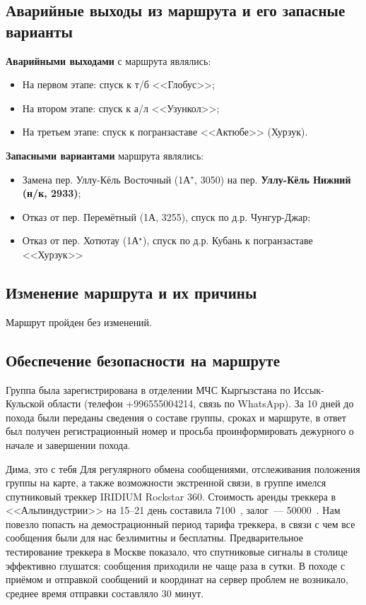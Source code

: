 \subsection{Аварийные выходы из маршрута и его запасные варианты}
\textbf{Аварийными выходами} с маршрута являлись:
\begin{itemize}
	\item На первом этапе: спуск к т/б <<Глобус>>;
	\item На втором этапе: спуск к а/л <<Узункол>>;
	\item На третьем этапе: спуск к погранзаставе <<Актюбе>> (Хурзук).
\end{itemize}
\textbf{Запасными вариантами} маршрута являлись:
\begin{itemize}
	\item Замена пер. Уллу-Кёль Восточный (1А$^\star$, 3050) на пер. \textbf{Уллу-Кёль Нижний (н/к, 2933)};
	\item Отказ от пер. Перемётный (1А, 3255), спуск по д.р. Чунгур-Джар;
	\item Отказ от пер. Хотютау (1А$^\star$), спуск по д.р. Кубань к погранзаставе <<Хурзук>>
\end{itemize}
\subsection{Изменение маршрута и их причины}
Маршрут пройден без изменений.
\subsection{Обеспечение безопасности на маршруте}
Группа была зарегистрирована в отделении МЧС Кыргызстана по Иссык-Кульской области (телефон +996555004214, связь по WhatsApp). За 10 дней до похода были переданы сведения о составе группы, сроках и маршруте, в ответ был получен регистрационный номер и просьба проинформировать дежурного о начале и завершении похода.

\alert{Дима, это с тебя Для регулярного обмена сообщениями, отслеживания положения группы на карте, а также возможности экстренной связи, в группе имелся спутниковый треккер IRIDIUM Rockstar 360. Стоимость аренды треккера в <<Альпиндустрии>> на 15--21 день составила 7100~\faRub, залог~--- 50000~\faRub. Нам повезло попасть на демострационный период тарифа треккера, в связи с чем все сообщения были для нас безлимитны и бесплатны. Предварительное тестирование треккера в Москве показало, что спутниковые сигналы в столице эффективно глушатся: сообщения приходили не чаще раза в сутки. В походе с приёмом и отправкой сообщений и координат на сервер проблем не возникало, среднее время отправки составляло 30 минут.}

